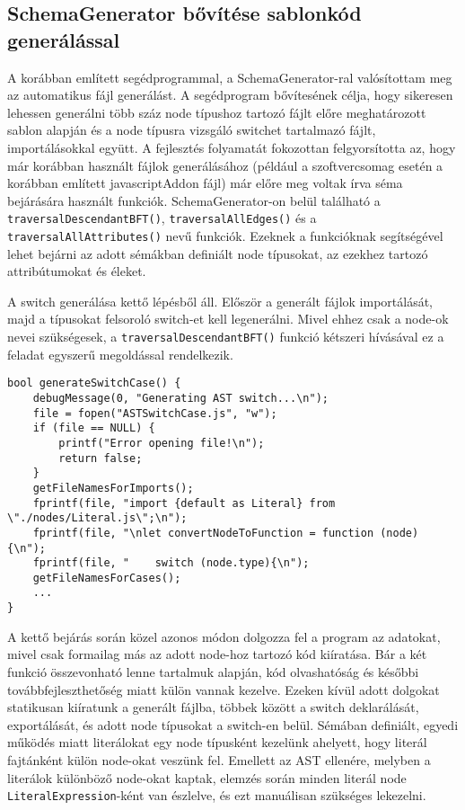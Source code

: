 \subsection{SchemaGenerator bővítése sablonkód generálással}

A korábban említett segédprogrammal, a SchemaGenerator-ral valósítottam meg az automatikus fájl generálást.
A segédprogram bővítesének célja, hogy sikeresen lehessen generálni több száz node típushoz tartozó fájlt előre meghatározott sablon alapján és a node típusra vizsgáló switchet tartalmazó fájlt, importálásokkal együtt. A fejlesztés folyamatát fokozottan felgyorsította az, hogy már korábban használt fájlok generálásához (például a szoftvercsomag esetén a korábban említett javascriptAddon fájl) már előre meg voltak írva séma bejárására használt funkciók. 
SchemaGenerator-on belül található a \texttt{traversalDescendantBFT()}, \texttt{traversalAllEdges()} és a \texttt{traversalAllAttributes()} nevű funkciók. Ezeknek a funkcióknak segítségével lehet bejárni az adott sémákban definiált node típusokat, az ezekhez tartozó attribútumokat és éleket.  


A switch generálása kettő lépésből áll. Először a generált fájlok importálását, majd a típusokat felsoroló switch-et kell legenerálni. Mivel ehhez csak a node-ok nevei szükségesek, a \texttt{traversalDescendantBFT()} funkció kétszeri hívásával ez a feladat egyszerű megoldással rendelkezik.

\pagebreak

\begin{lstlisting}[caption={Fájl genetálásra használt funkció},label={lst:computedfiltering}, style={CStyle}]
bool generateSwitchCase() {
    debugMessage(0, "Generating AST switch...\n");
    file = fopen("ASTSwitchCase.js", "w");
    if (file == NULL) {
        printf("Error opening file!\n");
        return false;
    }
    getFileNamesForImports();
    fprintf(file, "import {default as Literal} from \"./nodes/Literal.js\";\n");
    fprintf(file, "\nlet convertNodeToFunction = function (node) {\n"); 
    fprintf(file, "    switch (node.type){\n");
    getFileNamesForCases();
    ...
}
\end{lstlisting}

A kettő bejárás során közel azonos módon dolgozza fel a program az adatokat, mivel csak formailag más az adott node-hoz tartozó kód kiíratása. Bár a két funkció összevonható lenne tartalmuk alapján, kód olvashatóság és későbbi továbbfejleszthetőség miatt külön vannak kezelve.
Ezeken kívül adott dolgokat statikusan kiíratunk a generált fájlba, többek között a switch deklarálását, exportálását, és adott node típusokat a switch-en belül. Sémában definiált, egyedi működés miatt literálokat egy node típusként kezelünk ahelyett, hogy literál fajtánként külön node-okat veszünk fel. Emellett az AST ellenére, melyben a literálok különböző node-okat kaptak, elemzés során minden literál node \texttt{LiteralExpression}-ként van észlelve, és ezt manuálisan szükséges lekezelni.

